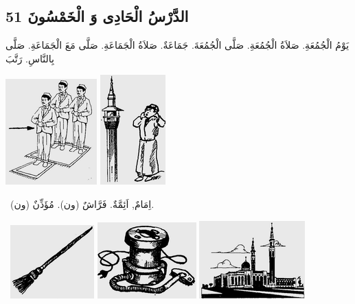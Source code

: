 \documentclass[a5paper]{article}
\begin{document}
\subsection{الدَّرْسُ الْحَادِى وَ الْخَمْسُونَ 51}
يَوْمُ الْجُمُعَةِ. صَلاَةُ الْجُمُعَةِ. صَلَّى الْجُمُعَةَ. جَمَاعَةٌ. صَلاَةُ الْجَمَاعَةِ. صَلَّى مَعَ الْجَمَاعَةِ. صَلَّى بِالنَّاسِ. رَتَّبَ 

 \includegraphics[width=1.3854in,height=1.6043in]{MuhammadBagauddinlatinized-img166.png}   \includegraphics[width=0.9898in,height=1.6665in]{MuhammadBagauddinlatinized-img167.png} 

\ اِمَامٌ, اَئِمَّةٌ. فَرَّاشٌ (ون). مُؤَذِّنٌ (ون). 

\  \includegraphics[width=1.2709in,height=1.1146in]{MuhammadBagauddinlatinized-img168.png}   \includegraphics[width=1.5in,height=1.1563in]{MuhammadBagauddinlatinized-img169.png}   \includegraphics[width=1.6043in,height=1.1772in]{MuhammadBagauddinlatinized-img170.png} 
\end{document}
